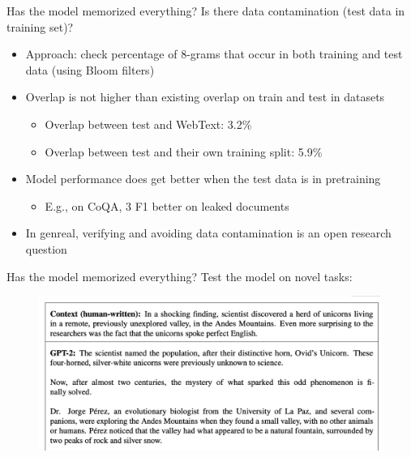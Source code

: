 \documentclass[usenames,dvipsnames,notes,11pt,aspectratio=169,hyperref={colorlinks=true, linkcolor=blue}]{beamer}
\begin{document}
\begin{frame}
    {Has the model memorized everything?}
    Is there data contamination (test data in training set)?
    \begin{itemize}[<+->]
        \item Approach: check percentage of 8-grams that occur in both training and test data (using Bloom filters)
        \item Overlap is not higher than existing overlap on train and test in datasets
        \begin{itemize}
            \item Overlap between test and WebText: 3.2\%
            \item Overlap between test and their own training split: 5.9\%
        \end{itemize}
        \item Model performance does get better when the test data is in pretraining
        \begin{itemize}
            \item E.g., on CoQA, 3 F1 better on leaked documents 
        \end{itemize}
        \item In genreal, verifying and avoiding data contamination is an open research question
    \end{itemize}
\end{frame}

\begin{frame}
    {Has the model memorized everything?}
    Test the model on novel tasks:\\[-1em]
    \begin{figure}
        \includegraphics[width=\textwidth]{figures/gpt2-gen}
    \end{figure}
\end{frame}
\end{document}
